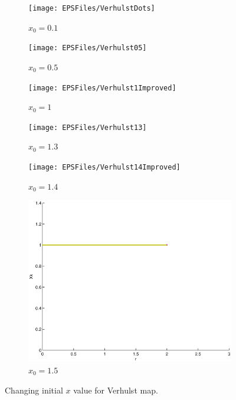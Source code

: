 \documentclass[a4wide, 10pt]{article}
\begin{document}
\begin{figure}[H]
        \centering
        \begin{subfigure}[b]{0.2\textwidth}
                \texttt{[image: EPSFiles/VerhulstDots]}
                \caption{$x_{0} = 0.1$}
                \label{fig:Verhulst0.1}
        \end{subfigure}
        \begin{subfigure}[b]{0.2\textwidth}
                \texttt{[image: EPSFiles/Verhulst05]}
                \caption{$x_{0} = 0.5$}
                \label{fig:Verhulst0.5}
        \end{subfigure}
        \begin{subfigure}[b]{0.2\textwidth}
                \texttt{[image: EPSFiles/Verhulst1Improved]}
                \caption{$x_{0} = 1$}
                \label{fig:Verhulst1}
        \end{subfigure}
        
        \begin{subfigure}[b]{0.2\textwidth}
                \texttt{[image: EPSFiles/Verhulst13]}
                \caption{$x_{0} = 1.3$}
                \label{fig:Verhulst1.3}
        \end{subfigure}
        \begin{subfigure}[b]{0.2\textwidth}
                \texttt{[image: EPSFiles/Verhulst14Improved]}
                \caption{$x_{0} = 1.4$}
                \label{fig:Verhulst1.4}
        \end{subfigure}  
        \begin{subfigure}[b]{0.2\textwidth}
                \includegraphics[width=\textwidth]{EPSFiles/Verhulst15}
                \caption{$x_{0} = 1.5$}
                \label{fig:Verhulst1.5}
        \end{subfigure}  
        \caption{Changing initial $x$ value for Verhulst map.}
\end{figure}
\end{document}

